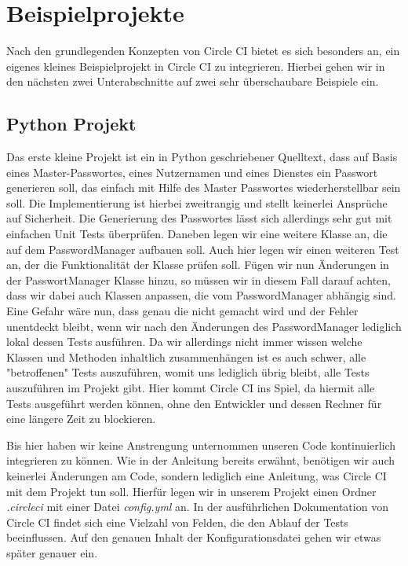 \documentclass[11pt]{article}
\begin{document}
\section{Beispielprojekte}
Nach den grundlegenden Konzepten von Circle CI bietet es sich besonders an, ein eigenes kleines
Beispielprojekt in Circle CI zu integrieren. Hierbei gehen wir in den nächsten zwei Unterabschnitte
auf zwei sehr überschaubare Beispiele ein.

\subsection{Python Projekt}
Das erste kleine Projekt ist ein in Python geschriebener Quelltext, dass auf Basis eines Master-Passwortes,
eines Nutzernamen und eines Dienstes ein Passwort generieren soll, das einfach mit Hilfe des Master
Passwortes wiederherstellbar sein soll. Die Implementierung ist hierbei zweitrangig und stellt
keinerlei Ansprüche auf Sicherheit.
Die Generierung des Passwortes lässt sich allerdings sehr gut mit einfachen Unit Tests überprüfen.
Daneben legen wir eine weitere Klasse an, die auf dem PasswordManager aufbauen soll.
Auch hier legen wir einen weiteren Test an, der die Funktionalität der Klasse prüfen soll.
Fügen wir nun Änderungen in der PasswortManager Klasse hinzu, so müssen wir in diesem Fall darauf achten,
dass wir dabei auch Klassen anpassen, die vom PasswordManager abhängig sind. Eine Gefahr wäre nun, dass
genau die nicht gemacht wird und der Fehler unentdeckt bleibt, wenn wir nach den Änderungen des
PasswordManager lediglich lokal dessen Tests ausführen.
Da wir allerdings nicht immer wissen welche Klassen und Methoden inhaltlich zusammenhängen ist es auch 
schwer, alle "betroffenen" Tests auszuführen, womit uns lediglich übrig bleibt, alle Tests auszuführen
im Projekt gibt.
Hier kommt Circle CI ins Spiel, da hiermit alle Tests ausgeführt werden können, ohne den Entwickler und
dessen Rechner für eine längere Zeit zu blockieren.

Bis hier haben wir keine Anstrengung unternommen unseren Code kontinuierlich integrieren zu können. Wie
in der Anleitung bereits erwähnt, benötigen wir auch keinerlei Änderungen am Code, sondern lediglich eine
Anleitung, was Circle CI mit dem Projekt tun soll. Hierfür legen wir in unserem Projekt einen Ordner
\textit{.circleci} mit einer Datei \textit{config.yml} an. In der ausführlichen Dokumentation von Circle CI
findet sich eine Vielzahl von Felden, die den Ablauf der Tests beeinflussen. Auf den genauen Inhalt der Konfigurationsdatei gehen wir etwas später genauer ein.
\end{document}
